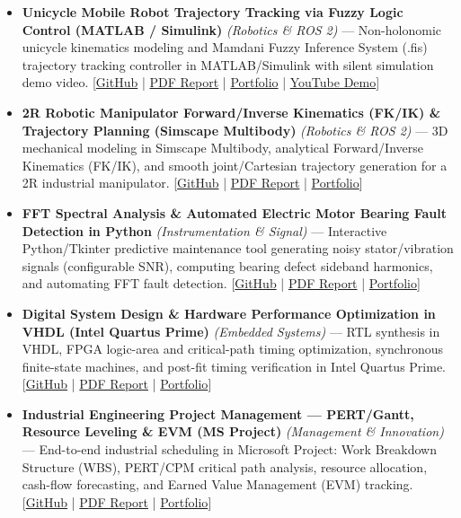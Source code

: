 \documentclass[10pt,a4paper]{article}
\begin{document}
\begin{itemize}
\item \textbf{Unicycle Mobile Robot Trajectory Tracking via Fuzzy Logic Control (MATLAB / Simulink)} \textit{(Robotics \& ROS 2)} --- Non-holonomic unicycle kinematics modeling and Mamdani Fuzzy Inference System (.fis) trajectory tracking controller in MATLAB/Simulink with silent simulation demo video. [\href{https://github.com/scidelo-andriasahy/unicycle-mobile-robot-fuzzy-simulink}{GitHub} | \href{https://scidelo-andriasahy.github.io/assets/pdfs/Rapport_Robot_Mobile_Unicycle_Flou.pdf}{PDF Report} | \href{https://scidelo-andriasahy.github.io/?project=14}{Portfolio} | \href{https://youtu.be/6zdbtt15iCY}{YouTube Demo}]
\item \textbf{2R Robotic Manipulator Forward/Inverse Kinematics (FK/IK) \& Trajectory Planning (Simscape Multibody)} \textit{(Robotics \& ROS 2)} --- 3D mechanical modeling in Simscape Multibody, analytical Forward/Inverse Kinematics (FK/IK), and smooth joint/Cartesian trajectory generation for a 2R industrial manipulator. [\href{https://github.com/scidelo-andriasahy/robot-2r-fk-ik-trajectory-simscape}{GitHub} | \href{https://scidelo-andriasahy.github.io/assets/pdfs/Rapport_Robot_2R_FK_IK_Simscape.pdf}{PDF Report} | \href{https://scidelo-andriasahy.github.io/?project=15}{Portfolio}]
\item \textbf{FFT Spectral Analysis \& Automated Electric Motor Bearing Fault Detection in Python} \textit{(Instrumentation \& Signal)} --- Interactive Python/Tkinter predictive maintenance tool generating noisy stator/vibration signals (configurable SNR), computing bearing defect sideband harmonics, and automating FFT fault detection. [\href{https://github.com/scidelo-andriasahy/motor-bearing-fault-detection-python-fft}{GitHub} | \href{https://scidelo-andriasahy.github.io/assets/pdfs/Rapport_Detection_Defauts_Roulement_Python.pdf}{PDF Report} | \href{https://scidelo-andriasahy.github.io/?project=16}{Portfolio}]
\item \textbf{Digital System Design \& Hardware Performance Optimization in VHDL (Intel Quartus Prime)} \textit{(Embedded Systems)} --- RTL synthesis in VHDL, FPGA logic-area and critical-path timing optimization, synchronous finite-state machines, and post-fit timing verification in Intel Quartus Prime. [\href{https://github.com/scidelo-andriasahy/vhdl-digital-systems-quartus-optimization}{GitHub} | \href{https://scidelo-andriasahy.github.io/assets/pdfs/Rapport_VHDL_Quartus_Performance.pdf}{PDF Report} | \href{https://scidelo-andriasahy.github.io/?project=17}{Portfolio}]
\item \textbf{Industrial Engineering Project Management --- PERT/Gantt, Resource Leveling \& EVM (MS Project)} \textit{(Management \& Innovation)} --- End-to-end industrial scheduling in Microsoft Project: Work Breakdown Structure (WBS), PERT/CPM critical path analysis, resource allocation, cash-flow forecasting, and Earned Value Management (EVM) tracking. [\href{https://github.com/scidelo-andriasahy/industrial-project-management-msproject-pert-gantt}{GitHub} | \href{https://scidelo-andriasahy.github.io/assets/pdfs/Rapport_MSProject_Gestion_EN.pdf}{PDF Report} | \href{https://scidelo-andriasahy.github.io/?project=18}{Portfolio}]

\end{itemize}
\end{document}
